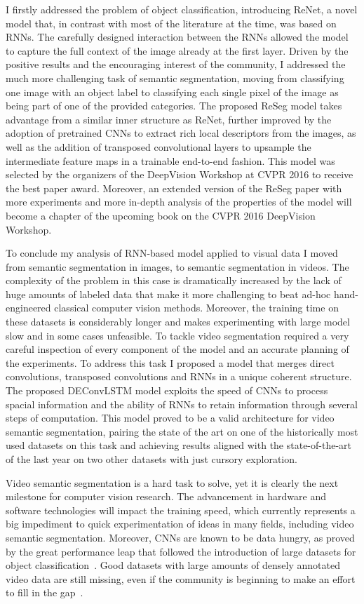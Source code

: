 I firstly addressed the problem of object classification, introducing ReNet, a
novel model that, in contrast with most of the literature at the time, was
based on RNNs. The carefully designed interaction between the RNNs allowed the
model to capture the full context of the image already at the first layer.
Driven by the positive results and the encouraging interest of the community, I
addressed the much more challenging task of semantic segmentation, moving from
classifying one image with an object label to classifying each single pixel of
the image as being part of one of the provided categories. The proposed ReSeg
model takes advantage from a similar inner structure as ReNet, further improved
by the adoption of pretrained CNNs to extract rich local descriptors from the
images, as well as the addition of transposed convolutional layers to upsample
the intermediate feature maps in a trainable end-to-end fashion. This model was
selected by the organizers of the DeepVision Workshop at CVPR 2016 to receive
the best paper award. Moreover, an extended version of the ReSeg paper with
more experiments and more in-depth analysis of the properties of the model will
become a chapter of the upcoming book on the CVPR 2016 DeepVision Workshop.

To conclude my analysis of RNN-based model applied to visual data I moved from
semantic segmentation in images, to semantic segmentation in videos. The
complexity of the problem in this case is dramatically increased by the lack of
huge amounts of labeled data that make it more challenging to beat ad-hoc
hand-engineered classical computer vision methods. Moreover, the training time
on these datasets is considerably longer and makes experimenting with large
model slow and in some cases unfeasible. To tackle video segmentation required
a very careful inspection of every component of the model and an accurate
planning of the experiments. To address this task I proposed a model that
merges direct convolutions, transposed convolutions and RNNs in a unique
coherent structure. The proposed DEConvLSTM model exploits the speed of CNNs to
process spacial information and the ability of RNNs to retain information
through several steps of computation. This model proved to be a valid
architecture for video semantic segmentation, pairing the state of the art on
one of the historically most used datasets on this task and achieving results
aligned with the state-of-the-art of the last year on two other datasets with
just cursory exploration.

Video semantic segmentation is a hard task to solve, yet it is clearly the next
milestone for computer vision research. The advancement in hardware and
software technologies will impact the training speed, which currently
represents a big impediment to quick experimentation of ideas in many fields,
including video semantic segmentation. Moreover, CNNs are known to be data
hungry, as proved by the great performance leap that followed the introduction
of large datasets for object classification~\citep{ILSVRCarxiv14}. Good
datasets with large amounts of densely annotated video data are still missing,
even if the community is beginning to make an effort to fill in the
gap~\citep[see~e.g.,~][]{Perazzi2016,lin2014microsoft}.

